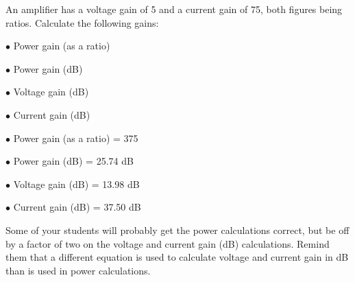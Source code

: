 

An amplifier has a voltage gain of 5 and a current gain of 75, both figures being ratios.  Calculate the following gains:

\medskip
\item{$\bullet$} Power gain (as a ratio)
\item{$\bullet$} Power gain (dB)
\item{$\bullet$} Voltage gain (dB)
\item{$\bullet$} Current gain (dB)
\medskip







\medskip
\item{$\bullet$} Power gain (as a ratio) = 375
\item{$\bullet$} Power gain (dB) = 25.74 dB
\item{$\bullet$} Voltage gain (dB) = 13.98 dB
\item{$\bullet$} Current gain (dB) = 37.50 dB
\medskip







Some of your students will probably get the power calculations correct, but be off by a factor of two on the voltage and current gain (dB) calculations.  Remind them that a different equation is used to calculate voltage and current gain in dB than is used in power calculations.




